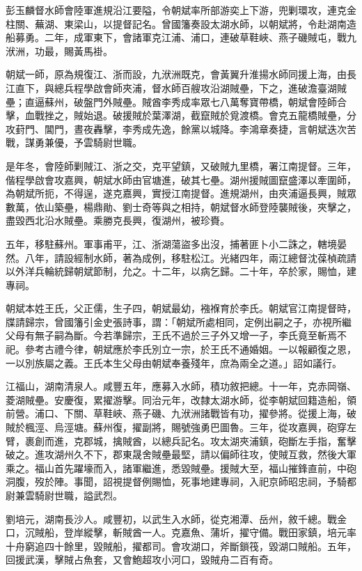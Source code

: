 \begin{pinyinscope}
彭玉麟督水師會陸軍進規沿江要隘，令朝斌率所部游奕上下游，兜剿環攻，連克金柱關、蕪湖、東梁山，以提督記名。曾國籓奏設太湖水師，以朝斌將，令赴湖南造船募勇。二年，成軍東下，會諸軍克江浦、浦口，連破草鞋峽、燕子磯賊屯，戰九洑洲，功最，賜黃馬褂。

朝斌一師，原為規復江、浙而設，九洑洲既克，會黃翼升淮揚水師同援上海，由長江直下，與總兵程學啟會師夾浦，督水師百艘攻沿湖賊壘，下之，進破澹臺湖賊壘；直逼蘇州，破盤門外賊壘。賊酋李秀成率眾七八萬奪寶帶橋，朝斌會陸師合擊，血戰挫之，賊始退。破援賊於葉澤湖，截竄賊於覓渡橋。會克五龍橋賊壘，分攻葑門、閶門，晝夜轟擊，李秀成先逸，餘黨以城降。李鴻章奏捷，言朝斌迭次苦戰，謀勇兼優，予雲騎尉世職。

是年冬，會陸師剿賊江、浙之交，克平望鎮，又破賊九里橋，署江南提督。三年，偕程學啟會攻嘉興，朝斌水師由官塘進，破其七壘。湖州援賊圖竄盛澤以牽圍師，為朝斌所扼，不得逞，遂克嘉興，實授江南提督。進規湖州，由夾浦逼長興，賊眾數萬，依山築壘，楊鼎勛、劉士奇等與之相持，朝斌督水師登陸襲賊後，夾擊之，盡毀西北沿水賊壘。乘勝克長興，復湖州，被珍賚。

五年，移駐蘇州。軍事甫平，江、浙湖蕩盜多出沒，捕著匪卜小二誅之，轄境晏然。八年，請設經制水師，著為成例，移駐松江。光緒四年，兩江總督沈葆楨疏請以外洋兵輪統歸朝斌節制，允之。十二年，以病乞歸。二十年，卒於家，賜恤，建專祠。

朝斌本姓王氏，父正儒，生子四，朝斌最幼，襁褓育於李氏。朝斌官江南提督時，牒請歸宗，曾國籓引金史張詩事，謂：「朝斌所處相同，定例出嗣之子，亦視所繼父母有無子嗣為斷。今若準歸宗，王氏不過於三子外又增一子，李氏竟至斬焉不祀。參考古禮今律，朝斌應於李氏別立一宗，於王氏不通婚姻。一以報顧復之恩，一以別族屬之義。王氏本生父母由朝斌奉養殘年，庶為兩全之道。」詔如議行。

江福山，湖南清泉人。咸豐五年，應募入水師，積功敘把總。十一年，克赤岡嶺、菱湖賊壘。安慶復，累擢游擊。同治元年，改隸太湖水師，從李朝斌回籍造船，領前營。浦口、下關、草鞋峽、燕子磯、九洑洲諸戰皆有功，擢參將。從援上海，破賊於楓涇、烏涇塘。蘇州復，擢副將，賜號強勇巴圖魯。三年，從攻嘉興，砲穿左臂，裹創而進，克郡城，擒賊酋，以總兵記名。攻太湖夾浦鎮，砲斷左手指，奮擊破之。進攻湖州久不下，郡東晟舍賊壘最堅，請以偏師往攻，使賊互救，然後大軍乘之。福山首先躍壕而入，諸軍繼進，悉毀賊壘。援賊大至，福山摧鋒直前，中砲洞腹，歿於陣。事聞，詔視提督例賜恤，死事地建專祠，入祀京師昭忠祠，予騎都尉兼雲騎尉世職，謚武烈。

劉培元，湖南長沙人。咸豐初，以武生入水師，從克湘潭、岳州，敘千總。戰金口，沉賊船，登岸縱擊，斬賊酋一人。克嘉魚、蒲圻，擢守備。戰田家鎮，培元率十舟窮追四十餘里，毀賊船，擢都司。會攻湖口，斧斷鎖筏，毀湖口賊船。五年，回援武漢，擊賊占魚套，又會鮑超攻小河口，毀賊舟二百有奇。


\end{pinyinscope}
